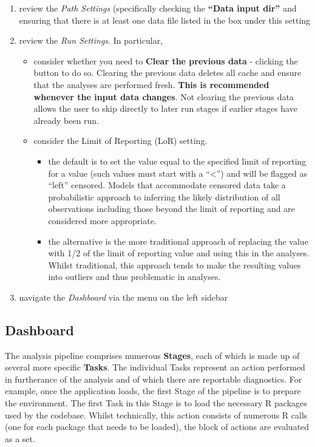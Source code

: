 \documentclass[
  8pt,
  a4paper]{article}
\providecommand{\tightlist}{%
  \setlength{\itemsep}{0pt}\setlength{\parskip}{0pt}}\usepackage{longtable,booktabs,array}
\begin{document}
\begin{enumerate}
\def\labelenumi{\arabic{enumi}.}
\tightlist
\item
  review the \emph{Path Settings} (specifically checking the
  \textbf{``Data input dir''} and ensuring that there is at least one
  data file listed in the box under this setting
\item
  review the \emph{Run Settings}. In particular,

  \begin{itemize}
  \tightlist
  \item
    consider whether you need to \textbf{Clear the previous data} -
    clicking the button to do so. Clearing the previous data deletes all
    cache and ensure that the analyses are performed fresh. \textbf{This
    is recommended whenever the input data changes}. Not clearing the
    previous data allows the user to skip directly to later run stages
    if earlier stages have already been run.
  \item
    consider the Limit of Reporting (LoR) setting.

    \begin{itemize}
    \tightlist
    \item
      the default is to set the value equal to the specified limit of
      reporting for a value (such values must start with a
      ``\textless{}'') and will be flagged as ``left'' censored. Models
      that accommodate censored data take a probabilistic approach to
      inferring the likely distribution of all observations including
      those beyond the limit of reporting and are considered more
      appropriate.
    \item
      the alternative is the more traditional approach of replacing the
      value with 1/2 of the limit of reporting value and using this in
      the analyses. Whilst traditional, this approach tends to make the
      resulting values into outliers and thus problematic in analyses.
    \end{itemize}
  \end{itemize}
\item
  navigate the \emph{Dashboard} via the menu on the left sidebar
\end{enumerate}

\subsection{Dashboard}\label{sec-dashboard}

The analysis pipeline comprises numerous \textbf{Stages}, each of which
is made up of several more specific \textbf{Tasks}. The individual Tasks
represent an action performed in furtherance of the analysis and of
which there are reportable diagnostics. For example, once the
application loads, the first Stage of the pipeline is to prepare the
environment. The first Task in this Stage is to load the necessary R
packages used by the codebase. Whilst technically, this action consists
of numerous R calls (one for each package that needs to be loaded), the
block of actions are evaluated as a set.
\end{document}
